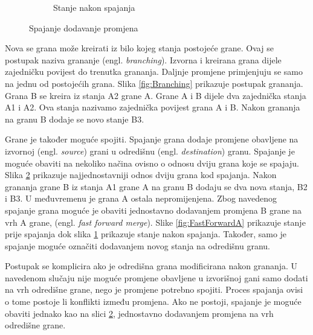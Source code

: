 \documentclass[times, utf8, diplomski, numeric]{fer}
\newcommand{\eng}[1]{(engl. \textit{#1})}
\begin{document}
\begin{figure}
\begin{subfigure}{.49\textwidth}
\caption{Stanje nakon spajanja}
\label{fig:FastForwardB}
\end{subfigure}
\caption{Spajanje dodavanje promjena}
\label{fig:FastForward}
\end{figure}

Nova se grana može kreirati iz bilo kojeg stanja postojeće grane. Ovaj se postupak naziva grananje \eng{branching}. Izvorna i kreirana grana dijele zajedničku povijest do trenutka grananja. Daljnje promjene primjenjuju se samo na jednu od postojećih grana. Slika \ref{fig:Branching} prikazuje postupak grananja. Grana B se kreira iz stanja A2 grane A. Grane A i B dijele dva zajednička stanja A1 i A2. Ova stanja nazivamo zajednička povijest grana A i B. Nakon grananja na granu B dodaje se novo stanje B3.

Grane je također moguće spojiti. Spajanje grana dodaje promjene obavljene na izvornoj \eng{source} grani u odredišnu \eng{destination} granu. Spajanje je moguće obaviti na nekoliko načina ovisno o odnosu dviju grana koje se spajaju. Slika \ref{fig:FastForward} prikazuje najjednostavniji odnos dviju grana kod spajanja. Nakon grananja grane B iz stanja A1 grane A na granu B dodaju se dva nova stanja, B2 i B3. U međuvremenu je grana A ostala nepromijenjena. Zbog navedenog spajanje grana moguće je obaviti jednostavno dodavanjem promjena B grane na vrh A grane, \eng{fast forward merge}. Slike \ref{fig:FastForwardA} prikazuje stanje prije spajanja dok slika \ref{fig:FastForwardB} prikazuje stanje nakon spajanja. Također, samo je spajanje moguće označiti dodavanjem novog stanja na odredišnu granu.

Postupak se komplicira ako je odredišna grana modificirana nakon grananja. U navedenom slučaju nije moguće promjene obavljene u izvorišnoj gani samo dodati na vrh odredišne grane, nego je promjene potrebno spojiti. Proces spajanja ovisi o tome postoje li konflikti između promjena. Ako ne postoji, spajanje je moguće obaviti jednako kao na slici \ref{fig:FastForward}, jednostavno dodavanjem promjena na vrh odredišne grane.
\end{document}

